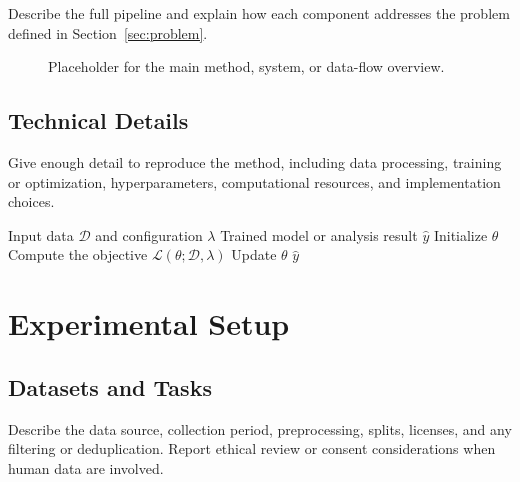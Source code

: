 \documentclass[sigconf,anonymous,review]{acmart}
\begin{document}
Describe the full pipeline and explain how each component addresses the
problem defined in Section~\ref{sec:problem}.

\begin{figure}[t]
  \centering
  \fbox{\rule{0pt}{1.15in}\rule{0.95\columnwidth}{0pt}}
  \caption{Placeholder for the main method, system, or data-flow overview.}
  \label{fig:method-overview}
\end{figure}

\subsection{Technical Details}
\label{sec:technical-details}

Give enough detail to reproduce the method, including data processing,
training or optimization, hyperparameters, computational resources, and
implementation choices.

\begin{algorithm}[t]
  \caption{Generic research procedure}
  \label{alg:procedure}
  \begin{algorithmic}[1]
    \Require Input data $\mathcal{D}$ and configuration $\lambda$
    \Ensure Trained model or analysis result $\hat{y}$
    \State Initialize $\theta$
      \State Compute the objective $\mathcal{L}(\theta;\mathcal{D},\lambda)$
      \State Update $\theta$
    \EndFor
    \State \Return $\hat{y}$
  \end{algorithmic}
\end{algorithm}

\section{Experimental Setup}
\label{sec:experiments}

\subsection{Datasets and Tasks}
\label{sec:datasets}

Describe the data source, collection period, preprocessing, splits, licenses,
and any filtering or deduplication. Report ethical review or consent
considerations when human data are involved.
\end{document}
